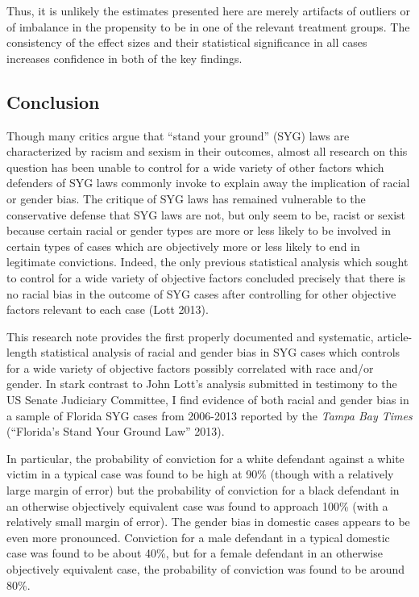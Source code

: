 \documentclass[12pt,article]{article}
\begin{document}
Thus, it is unlikely the estimates presented here are merely artifacts
of outliers or of imbalance in the propensity to be in one of the
relevant treatment groups. The consistency of the effect sizes and their
statistical significance in all cases increases confidence in both of
the key findings.

\subsection{Conclusion}\label{conclusion}

Though many critics argue that ``stand your ground'' (SYG) laws are
characterized by racism and sexism in their outcomes, almost all
research on this question has been unable to control for a wide variety
of other factors which defenders of SYG laws commonly invoke to explain
away the implication of racial or gender bias. The critique of SYG laws
has remained vulnerable to the conservative defense that SYG laws are
not, but only seem to be, racist or sexist because certain racial or
gender types are more or less likely to be involved in certain types of
cases which are objectively more or less likely to end in legitimate
convictions. Indeed, the only previous statistical analysis which sought
to control for a wide variety of objective factors concluded precisely
that there is no racial bias in the outcome of SYG cases after
controlling for other objective factors relevant to each case (Lott
2013).

This research note provides the first properly documented and
systematic, article-length statistical analysis of racial and gender
bias in SYG cases which controls for a wide variety of objective factors
possibly correlated with race and/or gender. In stark contrast to John
Lott's analysis submitted in testimony to the US Senate Judiciary
Committee, I find evidence of both racial and gender bias in a sample of
Florida SYG cases from 2006-2013 reported by the \emph{Tampa Bay Times}
(``Florida's Stand Your Ground Law'' 2013).

In particular, the probability of conviction for a white defendant
against a white victim in a typical case was found to be high at 90\%
(though with a relatively large margin of error) but the probability of
conviction for a black defendant in an otherwise objectively equivalent
case was found to approach 100\% (with a relatively small margin of
error). The gender bias in domestic cases appears to be even more
pronounced. Conviction for a male defendant in a typical domestic case
was found to be about 40\%, but for a female defendant in an otherwise
objectively equivalent case, the probability of conviction was found to
be around 80\%.
\end{document}
